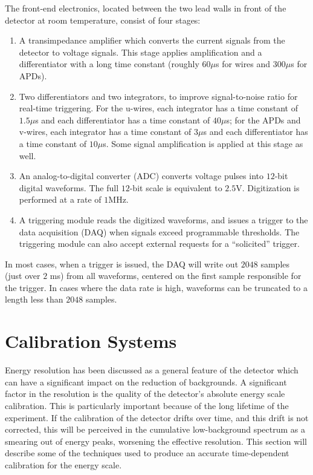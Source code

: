 The front-end electronics, located between the two lead walls in front of the detector at room temperature, consist of four stages:~\cite{detectorPartI,ReconstructionDocument}
\begin{enumerate}
\item A transimpedance amplifier which converts the current signals from the detector to voltage signals.  This stage applies amplification and a differentiator with a long time constant (roughly $60\mu$s for wires and $300\mu$s for APDs).
\item Two differentiators and two integrators, to improve signal-to-noise ratio for real-time triggering.  For the u-wires, each integrator has a time constant of $1.5\mu$s and each differentiator has a time constant of $40\mu$s; for the APDs and v-wires, each integrator has a time constant of $3\mu$s and each differentiator has a time constant of $10\mu$s.  Some signal amplification is applied at this stage as well.
\item An analog-to-digital converter (ADC) converts voltage pulses into $12$-bit digital waveforms.  The full $12$-bit scale is equivalent to $2.5$V.  Digitization is performed at a rate of $1$MHz.
\item A triggering module reads the digitized waveforms, and issues a trigger to the data acquisition (DAQ) when signals exceed programmable thresholds.  The triggering module can also accept external requests for a ``solicited'' trigger.
\end{enumerate}
In most cases, when a trigger is issued, the DAQ will write out $2048$ samples (just over $2$ ms) from all waveforms, centered on the first sample responsible for the trigger.  In cases where the data rate is high, waveforms can be truncated to a length less than $2048$ samples.

\section{Calibration Systems}\label{sec:DetectorCalibration}

Energy resolution has been discussed as a general feature of the detector which can have a significant impact on the reduction of backgrounds.   A significant factor in the resolution is the quality of the detector's absolute energy scale calibration.  This is particularly important because of the long lifetime of the experiment.  If the calibration of the detector drifts over time, and this drift is not corrected, this will be perceived in the cumulative low-background spectrum as a smearing out of energy peaks, worsening the effective resolution.  This section will describe some of the techniques used to produce an accurate time-dependent calibration for the energy scale.

